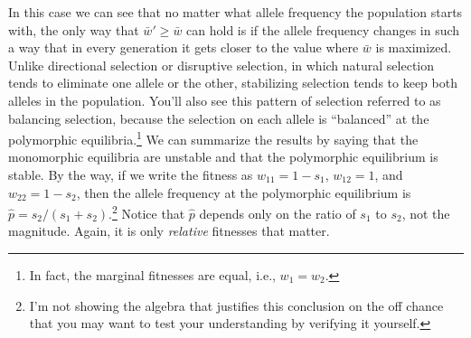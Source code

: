 In this case we can see that no matter what allele frequency the
population starts with, the only way that $\bar w' \ge \bar w$ can
hold is if the allele frequency changes in such a way that in every
generation it gets closer to the value where $\bar w$ is
maximized. Unlike directional selection or disruptive selection, in
which natural selection tends to eliminate one allele or the other,
stabilizing selection tends to keep both alleles in the
population. You'll also see this pattern of selection referred to as
balancing selection, because the selection on each allele is
``balanced'' at the polymorphic equilibria.\footnote{In fact, the
  marginal fitnesses are equal, i.e., $w_1=w_2$.} We can summarize the
results by saying that the monomorphic equilibria are unstable and
that the polymorphic equilibrium is stable. By the way, if we write
the fitness as $w_{11} = 1 - s_1$, $w_{12}=1$, and $w_{22}=1-s_2$,
then the allele frequency at the polymorphic equilibrium is $\hat
p=s_2/(s_1+s_2)$.\footnote{I'm not showing the algebra that justifies
  this conclusion on the off chance that you may want to test your
  understanding by verifying it yourself.} Notice that $\hat p$
depends only on the ratio of $s_1$ to $s_2$, not the magnitude. Again,
it is only {\it relative\/} fitnesses that matter.

